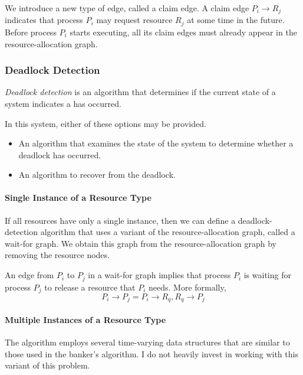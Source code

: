 We introduce a new type of edge, called a claim edge.
A claim edge $P_{i} \rightarrow R_{j}$ indicates that process $P_{i}$ may request resource $R_{j}$ at some time in the future.
Before process $P_{i}$ starts executing, all its claim edges must already appear in the resource-allocation graph.

\subsubsection{Deadlock Detection}\label{subsubsec:Deadlock_Detection}
\begin{definition}\label{def:Deadlock_Detection}
  \emph{Deadlock detection} is an algorithm that determines if the current state of a system indicates a  has occurred.
\end{definition}

In this system, either of these options may be provided.
\begin{itemize}[noitemsep]
\item An algorithm that examines the state of the system to determine whether a deadlock has occurred.
\item An algorithm to recover from the deadlock.
\end{itemize}

\paragraph{Single Instance of a Resource Type}\label{par:Deadlock_Detection-Resource_Single_Instance}
If all resources have only a single instance, then we can define a deadlock-detection algorithm that uses a variant of the resource-allocation graph, called a wait-for graph.
We obtain this graph from the resource-allocation graph by removing the resource nodes.

An edge from $P_{i}$ to $P_{j}$ in a wait-for graph implies that process $P_{i}$ is waiting for process $P_{j}$ to release a resource that $P_{i}$ needs.
More formally,
\begin{equation*}
  P_{i} \rightarrow P_{j} = P_{i} \rightarrow R_{q}, R_{q} \rightarrow P_{j}
\end{equation*}

\paragraph{Multiple Instances of a Resource Type}\label{par:Deadlock_Detection-Resource_Multiple_Instance}
The algorithm employs several time-varying data structures that are similar to those used in the banker’s algorithm.
I do not heavily invest in working with this variant of this problem.

